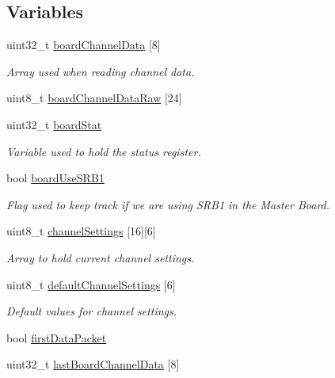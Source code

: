 \subsection*{Variables}
\begin{DoxyCompactItemize}
\item 
uint32\+\_\+t \hyperlink{group__ADS1299__Library_gad8303f3f7907884aa1ef5727220fd293}{board\+Channel\+Data} \mbox{[}8\mbox{]}
\begin{DoxyCompactList}\small\item\em Array used when reading channel data. \end{DoxyCompactList}\item 
uint8\+\_\+t \hyperlink{group__ADS1299__Library_gaa891a075c92bada339ffdb3a6f8c5ac8}{board\+Channel\+Data\+Raw} \mbox{[}24\mbox{]}
\item 
uint32\+\_\+t \hyperlink{group__ADS1299__Library_ga50edda929d7766e162d89ec32181a93a}{board\+Stat}
\begin{DoxyCompactList}\small\item\em Variable used to hold the status register. \end{DoxyCompactList}\item 
bool \hyperlink{group__ADS1299__Library_ga1e02fad8a694c8bbfeba493b8be214e4}{board\+Use\+S\+R\+B1}
\begin{DoxyCompactList}\small\item\em Flag used to keep track if we are using S\+R\+B1 in the Master Board. \end{DoxyCompactList}\item 
uint8\+\_\+t \hyperlink{group__ADS1299__Library_ga301925f8d0be3a235549a1d8a2775909}{channel\+Settings} \mbox{[}16\mbox{]}\mbox{[}6\mbox{]}
\begin{DoxyCompactList}\small\item\em Array to hold current channel settings. \end{DoxyCompactList}\item 
uint8\+\_\+t \hyperlink{group__ADS1299__Library_ga0ec603fb6c5e40febc9a5139ef12969b}{default\+Channel\+Settings} \mbox{[}6\mbox{]}
\begin{DoxyCompactList}\small\item\em Default values for channel settings. \end{DoxyCompactList}\item 
bool \hyperlink{group__ADS1299__Library_gadc787c1c2290ed1c985a4dc4cde9f1a3}{first\+Data\+Packet}
\item 
uint32\+\_\+t \hyperlink{group__ADS1299__Library_ga30b28017ba0fb5095382131d900dbd8e}{last\+Board\+Channel\+Data} \mbox{[}8\mbox{]}

\end{DoxyCompactItemize}
